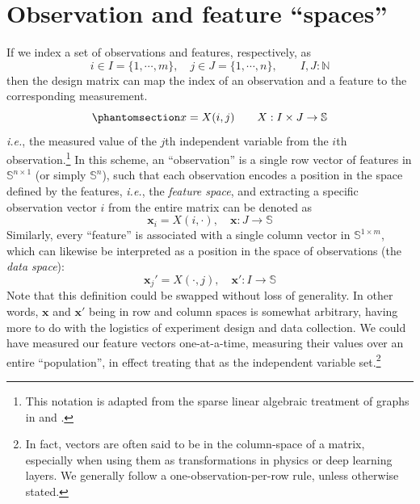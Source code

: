 \documentclass[%
	12pt,
		oneside,
		letterpaper
]{book}
\begin{document}
\section{Observation and feature ``spaces''}\label{sec-matrix-notation}

If we index a set of observations and features, respectively, as
\[ i\in I=\{1,\cdots,m\}, \quad j\in J=\{1,\cdots,n\},\qquad I,J:\mathbb{N}\]
then the design matrix can map the index of an observation and a feature
to the corresponding measurement.
\begin{equation}\phantomsection\label{eq-design-mat}{
x=X(i,j)\qquad X : I\times J \rightarrow \mathbb{S}
}\end{equation} \emph{i.e.}, the measured value of the \(j\)th
independent variable from the \(i\)th observation.\footnote{ This
  notation is adapted from the sparse linear algebraic treatment of
  graphs in \textcite{GraphAlgorithmsLanguage_Kepner2011} and
  \textcite{MathematicalfoundationsGraphBLAS_Kepner2016}.} In this
scheme, an ``observation'' is a single row vector of features in
\(\mathbb{S}^{n\times 1}\) (or simply \(\mathbb{S}^{n}\)), such that
each observation encodes a position in the space defined by the
features, \emph{i.e.}, the \emph{feature space}, and extracting a
specific observation vector \(i\) from the entire matrix can be denoted
as \[\mathbf{x}_i=X(i,\cdot),\quad \mathbf{x}:J\rightarrow\mathbb{S}\]
Similarly, every ``feature'' is associated with a single column vector
in \(\mathbb{S}^{1\times m}\), which can likewise be interpreted as a
position in the space of observations (the \emph{data space}):
\[\mathbf{x}_j'=X(\cdot,j),\quad \mathbf{x}':I\rightarrow\mathbb{S}\]
Note that this definition could be swapped without loss of generality.
In other words, \(\mathbf{x}\) and \(\mathbf{x}'\) being in row and
column spaces is somewhat arbitrary, having more to do with the
logistics of experiment design and data collection. We could have
measured our feature vectors one-at-a-time, measuring their values over
an entire ``population'', in effect treating that as the independent
variable set.\footnote{ In fact, vectors are often said to be in the
  column-space of a matrix, especially when using them as
  transformations in physics or deep learning layers. We generally
  follow a one-observation-per-row rule, unless otherwise stated.}
\end{document}

